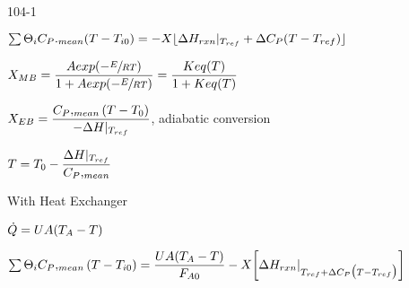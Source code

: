 \begin{mitframe}{104-1}
 \begin{listone}
	\item $\sum\nolimits\dimltemp_{\state}\cp._{mean}(\Temp-\Temp_{\state\init})=-X\lfloor\iipf\enthalpy_{rxn}|_{\Temp_{ref}}+\iipf\cp(\Temp-\Temp_{ref})\rfloor$
    	\begin{listtwo}
        	\item $X_{M\exergy}=\dfrac{\helmholtz{exp}(-\sfrac{\energy}{\gasconst\Temp})}{1+\helmholtz{exp}(-\sfrac{\energy}{\gasconst\Temp})}=\dfrac{\dilfac{eq}(\Temp)}{1+\dilfac{eq}(\Temp)}$
            \item $X_{\energy\exergy}=\dfrac{\cp,_{mean}(\Temp-\Temp_{\init})}{-\iipf\enthalpy|_{\Temp_{ref}}}$, adiabatic conversion
            \item $\Temp=\Temp_{\init}-\dfrac{\iipf\enthalpy|_{\Temp_{ref}}}{\cp,_{mean}}$
            \end{listtwo}
\item With Heat Exchanger
\item $\dot{\heatflow}=\uvel\helmholtz(\Temp_{\helmholtz}-\Temp)$
\item $\sum\nolimits\dimltemp_{\state}\cp,_{mean}(\Temp-\Temp_{\state\init})=\dfrac{\uvel\helmholtz(\Temp_{\helmholtz}-\Temp)}{\force_{\helmholtz\init}}-X\bigg[\iipf\enthalpy_{rxn}|_{\Temp_{ref}+\iipf\cp\big(\Temp-\Temp_{ref}\big)}\bigg]$

\end{listone}   
\end{mitframe}